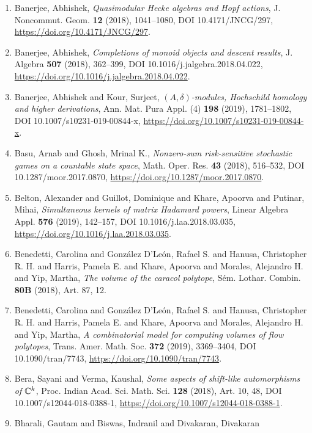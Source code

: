 \begin{enumerate}
{categories}, C. R. Math. Acad. Sci. Paris {\bf 356} (2018), 365--375, DOI 10.1016/j.crma.2018.02.012, \url{https://doi.org/10.1016/j.crma.2018.02.012}.
\item Banerjee, Abhishek, {\em Quasimodular {H}ecke algebras and {H}opf actions}, J. Noncommut. Geom. {\bf 12} (2018), 1041--1080, DOI 10.4171/JNCG/297, \url{https://doi.org/10.4171/JNCG/297}.
\item Banerjee, Abhishek, {\em Completions of monoid objects and descent results}, J. Algebra {\bf 507} (2018), 362--399, DOI 10.1016/j.jalgebra.2018.04.022, \url{https://doi.org/10.1016/j.jalgebra.2018.04.022}.
\item Banerjee, Abhishek and Kour, Surjeet, {\em {$(A,\delta)$}-modules, {H}ochschild homology and higher
derivations}, Ann. Mat. Pura Appl. (4) {\bf 198} (2019), 1781--1802, DOI 10.1007/s10231-019-00844-x, \url{https://doi.org/10.1007/s10231-019-00844-x}.
\item Basu, Arnab and Ghosh, Mrinal K., {\em Nonzero-sum risk-sensitive stochastic games on a countable
state space}, Math. Oper. Res. {\bf 43} (2018), 516--532, DOI 10.1287/moor.2017.0870, \url{https://doi.org/10.1287/moor.2017.0870}.
\item Belton, Alexander and Guillot, Dominique and Khare, Apoorva
and Putinar, Mihai, {\em Simultaneous kernels of matrix {H}adamard powers}, Linear Algebra Appl. {\bf 576} (2019), 142--157, DOI 10.1016/j.laa.2018.03.035, \url{https://doi.org/10.1016/j.laa.2018.03.035}.
\item Benedetti, Carolina and Gonz\'{a}lez D'Le\'{o}n, Rafael S. and Hanusa,
Christopher R. H. and Harris, Pamela E. and Khare, Apoorva and
Morales, Alejandro H. and Yip, Martha, {\em The volume of the caracol polytope}, S\'{e}m. Lothar. Combin. {\bf 80B} (2018), Art. 87, 12.
\item Benedetti, Carolina and Gonz\'{a}lez D'Le\'{o}n, Rafael S. and Hanusa,
Christopher R. H. and Harris, Pamela E. and Khare, Apoorva and
Morales, Alejandro H. and Yip, Martha, {\em A combinatorial model for computing volumes of flow polytopes}, Trans. Amer. Math. Soc. {\bf 372} (2019), 3369--3404, DOI 10.1090/tran/7743, \url{https://doi.org/10.1090/tran/7743}.
\item Bera, Sayani and Verma, Kaushal, {\em Some aspects of shift-like automorphisms of {$\Bbb C^k$}}, Proc. Indian Acad. Sci. Math. Sci. {\bf 128} (2018), Art. 10, 48, DOI 10.1007/s12044-018-0388-1, \url{https://doi.org/10.1007/s12044-018-0388-1}.
\item Bharali, Gautam and Biswas, Indranil and Divakaran, Divakaran

\end{enumerate}
